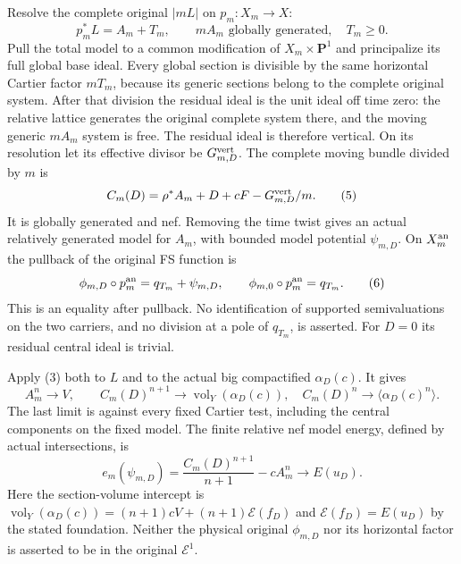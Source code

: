 \documentclass[10pt]{article}
\newcommand{\vol}{\operatorname{vol}}
\begin{document}
Resolve the complete original $|mL|$ on $p_m:X_m\to X$:
\[
 p_m^*L=A_m+T_m,\qquad mA_m\text{ globally generated},\quad T_m\geq0.
                                                               \tag{4}
\]
Pull the total model to a common modification of $X_m\times\mathbf P^1$
and principalize its full global base ideal. Every global section is
divisible by the same horizontal Cartier factor $mT_m$, because its
generic sections belong to the complete original system. After that
division the residual ideal is the unit ideal off time zero: the
relative lattice generates the original complete system there, and
the moving generic $mA_m$ system is free. The residual ideal is
therefore vertical. On its resolution let its effective divisor be
$G_{m,D}^{\rm vert}$. The complete moving bundle divided by $m$ is
\[
 C_m(D)=\rho^*A_m+D+cF-G_{m,D}^{\rm vert}/m.             \tag{5}
\]
It is globally generated and nef. Removing the time twist gives an
actual relatively generated model for $A_m$, with bounded model
potential $\psi_{m,D}$. On $X_m^{\rm an}$ the pullback of the original
FS function is
\[
 \phi_{m,D}\circ p_m^{\rm an}=q_{T_m}+\psi_{m,D},
             \qquad \phi_{m,0}\circ p_m^{\rm an}=q_{T_m}.           \tag{6}
\]
This is an equality after pullback. No identification of supported
semivaluations on the two carriers, and no division at a pole of
$q_{T_m}$, is asserted. For $D=0$ its residual central ideal is trivial.

Apply (3) both to $L$ and to the actual big compactified
$\alpha_D(c)$. It gives
\[
 A_m^n\to V,\qquad C_m(D)^{n+1}\to\vol_Y(\alpha_D(c)),\quad
 C_m(D)^n\to\langle\alpha_D(c)^n\rangle.                \tag{7}
\]
The last limit is against every fixed Cartier test, including the
central components on the fixed model. The finite relative nef model
energy, defined by actual intersections, is
\[
 e_m(\psi_{m,D})=\frac{C_m(D)^{n+1}}{n+1}-cA_m^n
                       \longrightarrow E(u_D).         \tag{8}
\]
Here the section-volume intercept is
$\vol_Y(\alpha_D(c))=(n+1)cV+(n+1)\mathscr E(f_D)$ and
$\mathscr E(f_D)=E(u_D)$ by the stated foundation.
Neither the physical original $\phi_{m,D}$ nor its horizontal factor
is asserted to be in the original $\mathcal E^1$.
\end{document}
